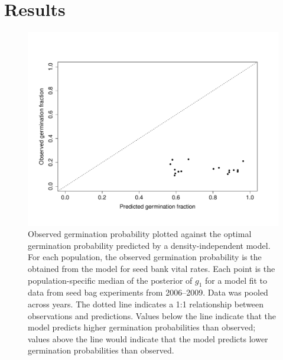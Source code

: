 \documentclass[12pt, oneside, titlepage]{article}   	%
\begin{document}
\section*{Results}
\begin{figure}[h]
   \centering
       \includegraphics[page=1,width=.9\textwidth]{../figures/obs_pred_germ.pdf}  
    \caption{ Observed germination probability plotted against the optimal germination probability predicted by a density-independent model. For each population, the observed germination probability is the obtained from the model for seed bank vital rates. Each point is the population-specific median of the posterior of $g_1$ for a model fit to data from seed bag experiments from 2006--2009. Data was pooled across years. The dotted line indicates a 1:1 relationship between observations and predictions. Values below the line indicate that the model predicts higher germination probabilities than observed; values above the line would indicate that the model predicts lower germination probabilities than observed. }
 \label{fig:obs_pred}
\end{figure}
\end{document}
